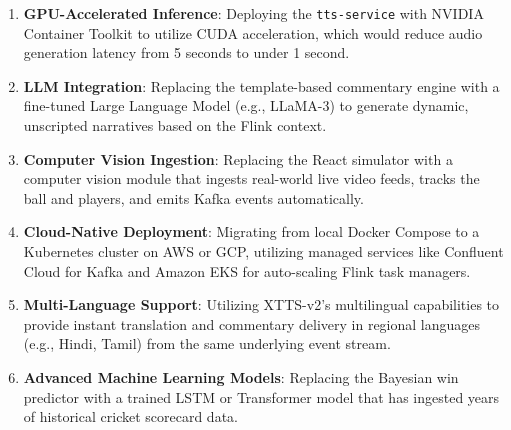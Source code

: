 \begin{enumerate}
\item \textbf{GPU-Accelerated Inference}: Deploying the \texttt{tts-service} with NVIDIA Container Toolkit to utilize CUDA acceleration, which would reduce audio generation latency from 5 seconds to under 1 second.
\item \textbf{LLM Integration}: Replacing the template-based commentary engine with a fine-tuned Large Language Model (e.g., LLaMA-3) to generate dynamic, unscripted narratives based on the Flink context.
\item \textbf{Computer Vision Ingestion}: Replacing the React simulator with a computer vision module that ingests real-world live video feeds, tracks the ball and players, and emits Kafka events automatically.
\item \textbf{Cloud-Native Deployment}: Migrating from local Docker Compose to a Kubernetes cluster on AWS or GCP, utilizing managed services like Confluent Cloud for Kafka and Amazon EKS for auto-scaling Flink task managers.
\item \textbf{Multi-Language Support}: Utilizing XTTS-v2's multilingual capabilities to provide instant translation and commentary delivery in regional languages (e.g., Hindi, Tamil) from the same underlying event stream.
\item \textbf{Advanced Machine Learning Models}: Replacing the Bayesian win predictor with a trained LSTM or Transformer model that has ingested years of historical cricket scorecard data.
\end{enumerate}
